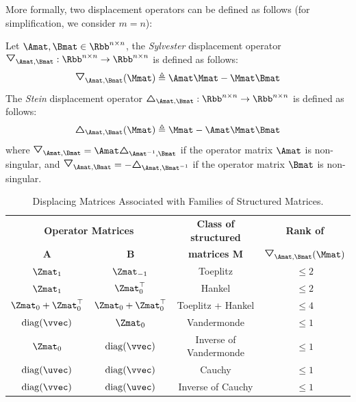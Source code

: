 More formally, two displacement operators can be defined as follows (for simplification, we consider $m = n$):
\begin{definition}
  Let $\Amat, \Bmat \in \Rbb^{n \times n}$, the \emph{Sylvester} displacement operator $\triangleopdown_{\Amat, \Bmat}: \Rbb^{n \times n} \rightarrow \Rbb^{n \times n}$ is defined as follows:
  \begin{equation}
    \triangleopdown_{\Amat, \Bmat} (\Mmat) \triangleq \Amat \Mmat - \Mmat \Bmat
  \end{equation}
  The \emph{Stein} displacement operator $\triangleopup_{\Amat, \Bmat}: \Rbb^{n \times n} \rightarrow \Rbb^{n \times n}$ is defined as follows:
  \begin{equation}
    \triangleopup_{\Amat, \Bmat} (\Mmat) \triangleq \Mmat - \Amat \Mmat \Bmat
  \end{equation}
  where $\triangleopdown_{\Amat, \Bmat} = \Amat \triangleopup_{\Amat^{-1}, \Bmat}$ if the operator matrix $\Amat$ is non-singular, and $\triangleopdown_{\Amat, \Bmat} = -\triangleopup_{\Amat, \Bmat^{-1}}$ if the operator matrix $\Bmat$ is non-singular.
\end{definition}



\begin{table}[t]
  \centering
  \begin{tabular}{c|c|c|c}
    \toprule
    \multicolumn{2}{c|}{\textbf{Operator Matrices}} & \textbf{Class of structured} & \textbf{Rank of } \\
    \textbf{A} & \textbf{B} & \textbf{matrices M} & $\triangleopdown_{\Amat, \Bmat}(\Mmat)$ \\
    \midrule
    $\Zmat_1$                & $\Zmat_{-1}$             & Toeplitz               & $\leq 2$ \\
    $\Zmat_1$                & $\Zmat_0^\top$           & Hankel                 & $\leq 2$ \\
    $\Zmat_0 + \Zmat_0^\top$ & $\Zmat_0 + \Zmat_0^\top$ & Toeplitz + Hankel      & $\leq 4$ \\
    $\diag(\vvec)$           & $\Zmat_0$                & Vandermonde            & $\leq 1$ \\
    $\Zmat_0$                & $\diag(\vvec)$           & Inverse of Vandermonde & $\leq 1$ \\
    $\diag(\uvec)$           & $\diag(\vvec)$           & Cauchy                 & $\leq 1$ \\
    $\diag(\vvec)$           & $\diag(\uvec)$           & Inverse of Cauchy      & $\leq 1$ \\
    \bottomrule
  \end{tabular}
  \caption{Displacing Matrices Associated with Families of Structured Matrices.}
  \label{table:ch2-displacing_matrices}
\end{table}



